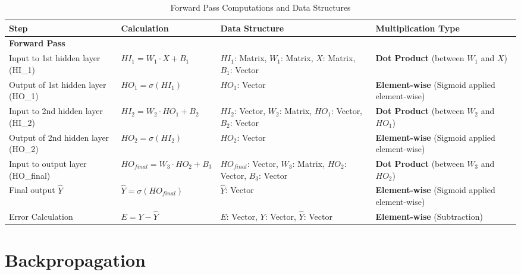 \documentclass[11pt]{article}
\begin{document}
\renewcommand{\arraystretch}{1.25}
\setlength{\tabcolsep}{4pt}

\begin{table}[h!]
\centering
\caption{Forward Pass Computations and Data Structures}
\begin{tabular}{|p{3.5cm}|p{5cm}|p{4cm}|p{3cm}|}
\hline
\textbf{Step} & \textbf{Calculation} & \textbf{Data Structure} & \textbf{Multiplication Type} \\ \hline

\multicolumn{4}{|l|}{\textbf{Forward Pass}} \\ \hline

Input to 1st hidden layer (HI\_1) &
$HI_1 = W_1 \cdot X + B_1$ &
$HI_1$: Matrix, $W_1$: Matrix, $X$: Matrix, $B_1$: Vector &
\textbf{Dot Product} (between $W_1$ and $X$) \\ \hline

Output of 1st hidden layer (HO\_1) &
$HO_1 = \sigma(HI_1)$ &
$HO_1$: Vector &
\textbf{Element-wise} (Sigmoid applied element-wise) \\ \hline

Input to 2nd hidden layer (HI\_2) &
$HI_2 = W_2 \cdot HO_1 + B_2$ &
$HI_2$: Vector, $W_2$: Matrix, $HO_1$: Vector, $B_2$: Vector &
\textbf{Dot Product} (between $W_2$ and $HO_1$) \\ \hline

Output of 2nd hidden layer (HO\_2) &
$HO_2 = \sigma(HI_2)$ &
$HO_2$: Vector &
\textbf{Element-wise} (Sigmoid applied element-wise) \\ \hline

Input to output layer (HO\_final) &
$HO_{final} = W_3 \cdot HO_2 + B_3$ &
$HO_{final}$: Vector, $W_3$: Matrix, $HO_2$: Vector, $B_3$: Vector &
\textbf{Dot Product} (between $W_3$ and $HO_2$) \\ \hline

Final output $\hat{Y}$ &
$\hat{Y} = \sigma(HO_{final})$ &
$\hat{Y}$: Vector &
\textbf{Element-wise} (Sigmoid applied element-wise) \\ \hline

Error Calculation &
$E = Y - \hat{Y}$ &
$E$: Vector, $Y$: Vector, $\hat{Y}$: Vector &
\textbf{Element-wise} (Subtraction) \\ \hline
\end{tabular}
\end{table}






\section{Backpropagation}
\renewcommand{\arraystretch}{1.25}
\setlength{\tabcolsep}{4pt}
\end{document}
